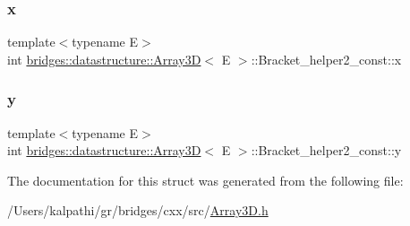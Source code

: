 \subsubsection{\texorpdfstring{x}{x}}
{\footnotesize\ttfamily template$<$typename E$>$ \\
int \mbox{\hyperlink{classbridges_1_1datastructure_1_1_array3_d}{bridges\+::datastructure\+::\+Array3D}}$<$ E $>$\+::Bracket\+\_\+helper2\+\_\+const\+::x}

\mbox{\label{structbridges_1_1datastructure_1_1_array3_d_1_1_bracket__helper2__const_a5c76d396209c5060f72c321d2b70e707}} 
\subsubsection{\texorpdfstring{y}{y}}
{\footnotesize\ttfamily template$<$typename E$>$ \\
int \mbox{\hyperlink{classbridges_1_1datastructure_1_1_array3_d}{bridges\+::datastructure\+::\+Array3D}}$<$ E $>$\+::Bracket\+\_\+helper2\+\_\+const\+::y}



The documentation for this struct was generated from the following file\+:\begin{DoxyCompactItemize}
\item 
/\+Users/kalpathi/gr/bridges/cxx/src/\mbox{\hyperlink{_array3_d_8h}{Array3\+D.\+h}}\end{DoxyCompactItemize}
